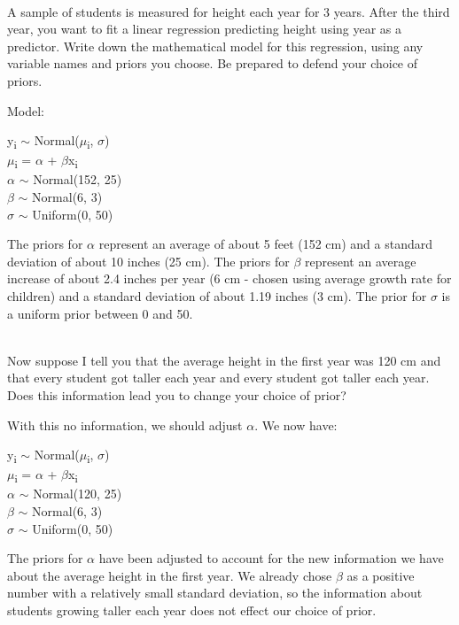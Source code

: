 \documentclass[12pt]{article}\usepackage[]{graphicx}\usepackage[]{color}
\newenvironment{problem}[2][Problem]{\begin{trivlist}
\item[\hskip \labelsep {\bfseries #1}\hskip \labelsep {\bfseries #2.}]}{\end{trivlist}}
\begin{document}
\begin{problem}{4M4}
\text{}\\
A sample of students is measured for height each year for 3 years. After the third year, you want to fit a linear regression predicting height using year as a predictor. Write down the mathematical model for this regression, using any variable names and priors you choose. Be prepared to defend your choice of priors.
\end{problem}

Model:
\begin{center}
y\textsubscript{i} $\sim$ Normal($\mu$\textsubscript{i}, $\sigma$)\\
$\mu$\textsubscript{i} = $\alpha$ + $\beta$x\textsubscript{i}\\
$\alpha$ $\sim$ Normal(152, 25)\\
$\beta$ $\sim$ Normal(6, 3)\\
$\sigma$ $\sim$ Uniform(0, 50)
\end{center}

The priors for $\alpha$ represent an average of about 5 feet (152 cm) and a standard deviation of about 10 inches (25 cm).
The priors for $\beta$ represent an average increase of about 2.4 inches per year (6 cm - chosen using average growth rate for children) and a standard deviation of about 1.19 inches (3 cm).
The prior for $\sigma$ is a uniform prior between 0 and 50.

\begin{problem}{4M5}
\text{}\\
Now suppose I tell you that the average height in the first year was 120 cm and that every student got taller each year and every student got taller each year. Does this information lead you to change your choice of prior?
\end{problem}

With this no information, we should adjust $\alpha$. We now have:
\begin{center}
y\textsubscript{i} $\sim$ Normal($\mu$\textsubscript{i}, $\sigma$)\\
$\mu$\textsubscript{i} = $\alpha$ + $\beta$x\textsubscript{i}\\
$\alpha$ $\sim$ Normal(120, 25)\\
$\beta$ $\sim$ Normal(6, 3)\\
$\sigma$ $\sim$ Uniform(0, 50)
\end{center}

The priors for $\alpha$ have been adjusted to account for the new information we have about the average height in the first year.
We already chose $\beta$ as a positive number with a relatively small standard deviation, so the information about students growing taller each year does not effect our choice of prior.
\end{document}
